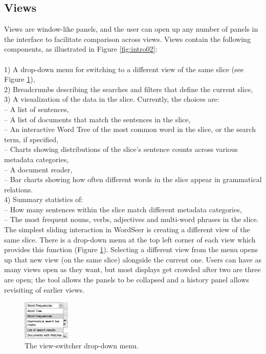 \documentclass{sig-alternate}
\begin{document}
\subsection{Views}
Views  are window-like panels, and the user can open up any number of panels in the interface to facilitate comparison across views.  Views contain the following components, as illustrated in Figure \ref{fig:intro02}:
\\
\\ 1) A drop-down menu for switching to a different view of the same slice (see Figure \ref{fig:chris03}),
\\ 2) Breadcrumbs describing the searches and filters that define the current slice,
\\ 3)  A visualization of the data in the slice. Currently, the choices are:
\\ \indent -- A list of sentences,
\\ \indent -- A list of documents that match the sentences in the slice,
\\ \indent -- An interactive Word Tree \cite{wattenberg_word_2008} of the most common word in the slice, or the search term, if specified,
\\ \indent -- Charts showing distributions of the slice's sentence counts across various metadata categories,
\\ \indent -- A document reader,
\\ \indent -- Bar charts showing how often different words in the slice  appear in grammatical relations.
\\ 4) Summary statistics of:
\\ \indent -- How many sentences within the slice match different metadata categories,
\\ \indent -- The most frequent nouns, verbs, adjectives and multi-word phrases in the slice.
\\


The simplest sliding interaction in WordSeer is creating a different view of the same slice.  There is a drop-down menu at the top left corner of each view which provides this function (Figure \ref{fig:chris03}).  Selecting a different view from the menu opens up that new view (on the same slice) alongside the current one. Users can have as many views open as they want, but most displays get crowded after two are three are open; the tool allows the panels to be collapsed and a history panel allows revisiting of earlier views.  
\begin{figure}[h!]
\begin{center}
\includegraphics[width=0.2\textwidth]{fig/chris/03.png}
\end{center}
\caption{ The view-switcher drop-down menu.\label{fig:chris03}}
\end{figure}
\end{document}
